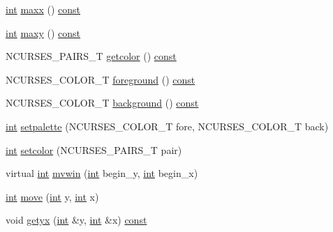 \begin{DoxyCompactItemize}
\item 
\hyperlink{term__entry_8h_ad65b480f8c8270356b45a9890f6499ae}{int} \hyperlink{class_n_curses_window_acb9c877669158b9a70de9064c1f53bd7}{maxx} () \hyperlink{term__entry_8h_a57bd63ce7f9a353488880e3de6692d5a}{const} 
\item 
\hyperlink{term__entry_8h_ad65b480f8c8270356b45a9890f6499ae}{int} \hyperlink{class_n_curses_window_ad407b64051686162efe0942303611b4d}{maxy} () \hyperlink{term__entry_8h_a57bd63ce7f9a353488880e3de6692d5a}{const} 
\item 
N\-C\-U\-R\-S\-E\-S\-\_\-\-P\-A\-I\-R\-S\-\_\-\-T \hyperlink{class_n_curses_window_a775a84d01db4186d0645c721e007e85e}{getcolor} () \hyperlink{term__entry_8h_a57bd63ce7f9a353488880e3de6692d5a}{const} 
\item 
N\-C\-U\-R\-S\-E\-S\-\_\-\-C\-O\-L\-O\-R\-\_\-\-T \hyperlink{class_n_curses_window_a70f9db473ace588be1af635644d2dfb3}{foreground} () \hyperlink{term__entry_8h_a57bd63ce7f9a353488880e3de6692d5a}{const} 
\item 
N\-C\-U\-R\-S\-E\-S\-\_\-\-C\-O\-L\-O\-R\-\_\-\-T \hyperlink{class_n_curses_window_ab9c965dc9eaceacd6ee134069f9e0537}{background} () \hyperlink{term__entry_8h_a57bd63ce7f9a353488880e3de6692d5a}{const} 
\item 
\hyperlink{term__entry_8h_ad65b480f8c8270356b45a9890f6499ae}{int} \hyperlink{class_n_curses_window_a9a8d57332e8eeb17877bd3f441be8604}{setpalette} (N\-C\-U\-R\-S\-E\-S\-\_\-\-C\-O\-L\-O\-R\-\_\-\-T fore, N\-C\-U\-R\-S\-E\-S\-\_\-\-C\-O\-L\-O\-R\-\_\-\-T back)
\item 
\hyperlink{term__entry_8h_ad65b480f8c8270356b45a9890f6499ae}{int} \hyperlink{class_n_curses_window_a8911fba9e1049a6f96255b2a24cfae92}{setcolor} (N\-C\-U\-R\-S\-E\-S\-\_\-\-P\-A\-I\-R\-S\-\_\-\-T pair)
\item 
virtual \hyperlink{term__entry_8h_ad65b480f8c8270356b45a9890f6499ae}{int} \hyperlink{class_n_curses_window_a16a143dfe0f3e2151aa467f9ff3238a4}{mvwin} (\hyperlink{term__entry_8h_ad65b480f8c8270356b45a9890f6499ae}{int} begin\-\_\-y, \hyperlink{term__entry_8h_ad65b480f8c8270356b45a9890f6499ae}{int} begin\-\_\-x)
\item 
\hyperlink{term__entry_8h_ad65b480f8c8270356b45a9890f6499ae}{int} \hyperlink{class_n_curses_window_a46431a0d98b988b168854501cc2275d0}{move} (\hyperlink{term__entry_8h_ad65b480f8c8270356b45a9890f6499ae}{int} y, \hyperlink{term__entry_8h_ad65b480f8c8270356b45a9890f6499ae}{int} x)
\item 
void \hyperlink{class_n_curses_window_a2fc82071d52649afa847f330947cb2ce}{getyx} (\hyperlink{term__entry_8h_ad65b480f8c8270356b45a9890f6499ae}{int} \&y, \hyperlink{term__entry_8h_ad65b480f8c8270356b45a9890f6499ae}{int} \&x) \hyperlink{term__entry_8h_a57bd63ce7f9a353488880e3de6692d5a}{const} 

\end{DoxyCompactItemize}
